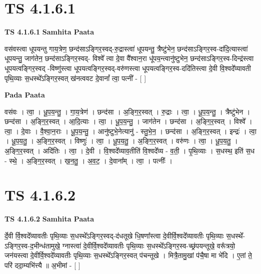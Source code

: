 \documentclass[17pt]{extarticle}
\begin{document}
\section*{ TS 4.1.6.1 }

\textbf{TS 4.1.6.1 } \newline
\textbf{Samhita Paata} \newline

वस॑वस्त्वा धूपयन्तु गाय॒त्रेण॒ छन्द॑साऽङ्गिर॒स्वद्-रु॒द्रास्त्वा॑ धूपयन्तु॒ त्रैष्टु॑भेन॒ छन्द॑साऽङ्गिर॒स्व-दा॑दि॒त्यास्त्वा॑ धूपयन्तु॒ जाग॑तेन॒ छन्द॑साऽङ्गिर॒स्वद्- विश्वे᳚ त्वा दे॒वा वै᳚श्वान॒रा धू॑पय॒न्त्वानु॑ष्टुभेन॒ छन्द॑साऽङ्गिर॒स्व-दिन्द्र॑स्त्वा धूपयत्वङ्गिर॒स्वद् -विष्णु॑स्त्वा धूपयत्वङ्गिर॒स्वद्-वरु॑णस्त्वा धूपयत्वङ्गिर॒स्व-ददि॑तिस्त्वा दे॒वी वि॒श्वदे᳚व्यावती पृथि॒व्याः स॒धस्थे᳚ऽङ्गिर॒स्वत् ख॑नत्ववट दे॒वानां᳚ त्वा॒ पत्नी᳚ - [  ] \newline

\textbf{Pada Paata} \newline

वस॑वः । त्वा॒ । धू॒प॒य॒न्तु॒ । गा॒य॒त्रेण॑ । छन्द॑सा । अ॒ङ्गि॒र॒स्वत् । रु॒द्राः । त्वा॒ । धू॒प॒य॒न्तु॒ । त्रैष्टु॑भेन । छन्द॑सा । अ॒ङ्गि॒र॒स्वत् । आ॒दि॒त्याः । त्वा॒ । धू॒प॒य॒न्तु॒ । जाग॑तेन । छन्द॑सा । अ॒ङ्गि॒र॒स्वत् । विश्वे᳚ । त्वा॒ । दे॒वाः । वै॒श्वा॒न॒राः । धू॒प॒य॒न्तु॒ । आनु॑ष्टुभे॒नेत्यानु॑ - स्तु॒भे॒न॒ । छन्द॑सा । अ॒ङ्गि॒र॒स्वत् । इन्द्रः॑ । त्वा॒ । धू॒प॒य॒तु॒ । अ॒ङ्गि॒र॒स्वत् । विष्णुः॑ । त्वा॒ । धू॒प॒य॒तु॒ । अ॒ङ्गि॒र॒स्वत् । वरु॑णः । त्वा॒ । धू॒प॒य॒तु॒ । अ॒ङ्गि॒र॒स्वत् । अदि॑तिः । त्वा॒ । दे॒वी । वि॒श्वदे᳚व्याव॒तीति॑ वि॒श्वदे᳚व्य - व॒ती॒ । पृ॒थि॒व्याः । स॒धस्थ॒ इति॑ स॒ध - स्थे॒ । अ॒ङ्गि॒र॒स्वत् । ख॒न॒तु॒ । अ॒व॒ट॒ । दे॒वाना᳚म् । त्वा॒ । पत्नीः᳚ ।  \newline




\section*{ TS 4.1.6.2 }

\textbf{TS 4.1.6.2 } \newline
\textbf{Samhita Paata} \newline

र्दे॒वी र्वि॒श्वदे᳚व्यावतीः पृथि॒व्याः स॒धस्थे᳚ऽङ्गिर॒स्वद्-द॑धतूखे धि॒षणा᳚स्त्वा दे॒वीर्वि॒श्वदे᳚व्यावतीः पृथि॒व्याः स॒धस्थे᳚-ऽङ्गिर॒स्व-द॒भीन्ध॑तामुखे॒ ग्नास्त्वा॑ दे॒वीर्वि॒श्वदे᳚व्यावतीः पृथि॒व्याः स॒धस्थे᳚ऽङ्गिर॒स्व-च्छ्र॑पयन्तूखे॒ वरू᳚त्रयो॒ जन॑यस्त्वा दे॒वीर्वि॒श्वदे᳚व्यावतीः पृथि॒व्याः स॒धस्थे᳚ऽङ्गिर॒स्वत् प॑चन्तूखे । मित्रै॒तामु॒खां प॑चै॒षा मा भे॑दि । ए॒तां ते॒ परि॑ ददा॒म्यभि॑त्त्यै ॥ अ॒भीमां - [  ] \newline
\end{document}
